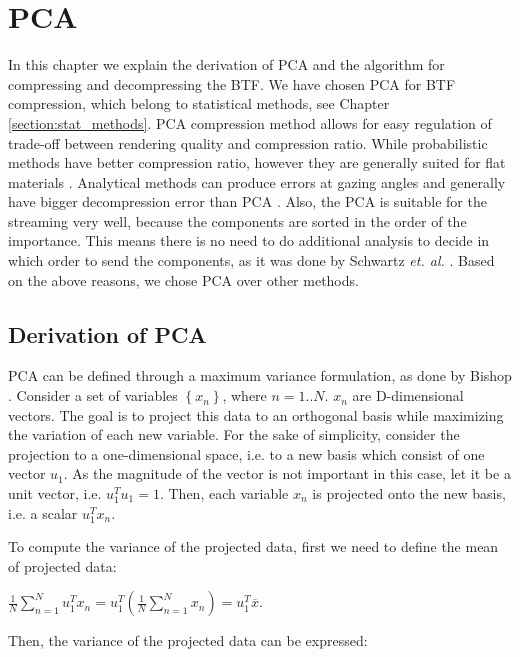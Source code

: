 \chapter{PCA}
\label{section:pca}


In this chapter we explain the derivation of PCA and the algorithm for compressing and decompressing the BTF.
We have chosen PCA for BTF compression, which belong to statistical methods, see Chapter \ref{section:stat_methods}.
PCA compression method allows for easy regulation of trade-off between rendering quality and compression ratio.
While probabilistic methods have better compression ratio, however they are generally suited for flat materials \cite{haindl}.
Analytical methods can produce errors at gazing angles and generally have bigger decompression error than PCA \cite{haindl}.
Also, the PCA is suitable for the streaming very well, because the components are sorted in the order of the importance.
This means there is no need to do additional analysis to decide in which order to send the components, as it was done by Schwartz \emph{et. al.} \cite{webglbtfstreaming}.
Based on the above reasons, we chose PCA over other methods.


 \section{Derivation of PCA}
\label{section:derivation_pca}

 PCA can be defined through a maximum variance formulation, as done by Bishop \cite{Bishop}.
 Consider a set of variables $\left \{ x_{n} \right \}$, where $n=1..N$. $x_{n}$ are D-dimensional vectors. The goal is to project this data to an orthogonal basis while maximizing the variation of each new variable.
For the sake of simplicity, consider the projection to a one-dimensional space, i.e. to a new basis which consist of one vector $u_{1}$. 
As the magnitude of the vector is not important in this case, let it be a unit vector, i.e. $u_{1}^Tu_{1}=1$.
 Then, each variable $x_{n}$ is projected onto the new basis, i.e. a scalar $u_{1}^Tx_{n}$.

 To compute the variance of the projected data, first we need to define the mean of projected data:

{\centering$\tfrac{1}{N}\sum_{n=1}^{N}u_{1}^Tx_{n}=u_{1}^T(\tfrac{1}{N}\sum_{n=1}^{N}x_{n})=u_{1}^T\overline{x}.$\\}

Then, the variance of the projected data can be expressed:

